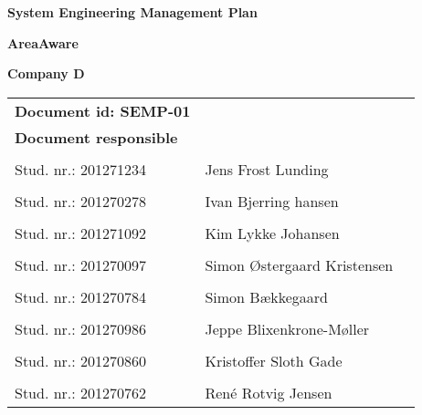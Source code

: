 
\centerline{\Huge\bfseries\color{ThemeColor} System Engineering Management Plan} 

\vspace{1em}
\centerline{\Large\bfseries\color{BlackColor} AreaAware} 

\vspace{5em}
\centerline{\large\bfseries\color{BlackColor}Company D} 




\begin{center}
   \begin{tabular}{ l l p{6cm} }
   \textbf{Document id: SEMP-01}& & \\
   \textbf{Document responsible}& & \\
   & & \\
   Stud. nr.: 201271234 & Jens Frost Lunding & \\\hline
   & & \\
   Stud. nr.: 201270278 & Ivan Bjerring hansen & \\\hline
   & & \\
   Stud. nr.: 201271092 & Kim Lykke Johansen & \\\hline
   & & \\  
   Stud. nr.: 201270097 & Simon Østergaard Kristensen & \\\hline
   & & \\
   Stud. nr.: 201270784  & Simon Bækkegaard & \\\hline
   & & \\
   Stud. nr.:  201270986 & Jeppe Blixenkrone-Møller & \\\hline
   & & \\
   Stud. nr.:  201270860 & Kristoffer Sloth Gade & \\\hline
   & & \\
   Stud. nr.:  201270762 & René Rotvig Jensen & \\\hline
   \end{tabular}       
\end{center}
\thispagestyle{empty} %
\restoregeometry

